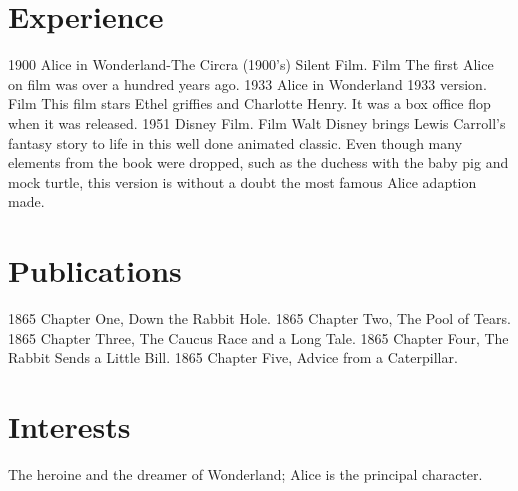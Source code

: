 \documentclass[letterpaper]{curriculum_vitae} %
\begin{document}
\section{Experience}
\begin{twenty}
    \twentyitem
    {1900}
    {Alice in Wonderland-The Circra (1900's) Silent Film.}
    {Film}
    {The first Alice on film was over a hundred years ago.}
    \twentyitem
    {1933}
    {Alice in Wonderland 1933 version.}
    {Film}
    {This film stars Ethel griffies and Charlotte Henry. It was a box office flop when it was released.}
    \twentyitem
    {1951}
    {Disney Film.}
    {Film}
    {Walt Disney brings Lewis Carroll's fantasy story to life in this well done animated classic. Even though many elements from the book were dropped, such as the duchess with the baby pig and mock turtle, this version is without a doubt the most famous Alice adaption made.}
\end{twenty}





\section{Publications}
\begin{twentyshort}
  \twentyitemshort
    {1865}
    {Chapter One, Down the Rabbit Hole.}
  \twentyitemshort
    {1865}
    {Chapter Two, The Pool of Tears.}
  \twentyitemshort
    {1865}
    {Chapter Three,  The Caucus Race and a Long Tale.}
  \twentyitemshort
    {1865}
    {Chapter Four,  The Rabbit Sends a Little Bill.}
  \twentyitemshort
    {1865}
    {Chapter Five,  Advice from a Caterpillar.}
\end{twentyshort}

\section{Interests}
The heroine and the dreamer of Wonderland;  Alice is the principal character.

\end{document}
